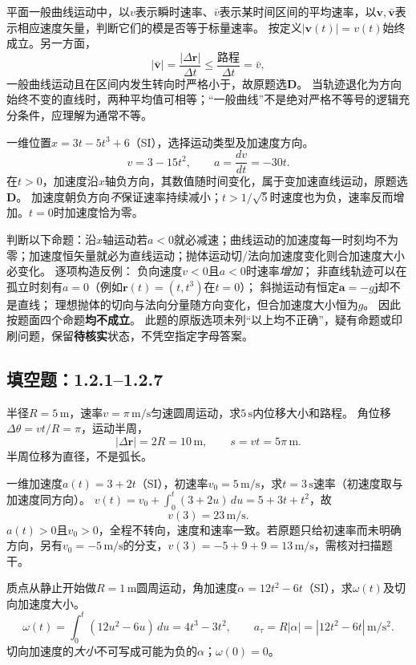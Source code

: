 \problemtext 平面一般曲线运动中，以$v$表示瞬时速率、$\bar v$表示某时间区间的平均速率，以$\bm v,\bar{\bm v}$表示相应速度矢量，判断它们的模是否等于标量速率。
\workings
按定义$|\bm v(t)|=v(t)$始终成立。另一方面，
\[
 |\bar{\bm v}|=\frac{|\Delta\bm r|}{\Delta t}
 \le \frac{\text{路程}}{\Delta t}=\bar v,
\]
一般曲线运动且在区间内发生转向时严格小于，故原题选\textbf{D}。
\crosscheck 当轨迹退化为方向始终不变的直线时，两种平均值可相等；“一般曲线”不是绝对严格不等号的逻辑充分条件，应理解为通常不等。

\problemtext 一维位置$x=3t-5t^3+6$（SI），选择运动类型及加速度方向。
\workings
\[
 v=3-15t^2,\qquad a=\frac{dv}{dt}=-30t.
\]
在$t>0$，加速度沿$x$轴负方向，其数值随时间变化，属于变加速直线运动，原题选\textbf{D}。
\crosscheck 加速度朝负方向\emph{不}保证速率持续减小；$t>1/\sqrt5$时速度也为负，速率反而增加。$t=0$时加速度恰为零。

\problemtext 判断以下命题：沿$x$轴运动若$a<0$就必减速；曲线运动的加速度每一时刻均不为零；加速度恒矢量就必为直线运动；抛体运动切/法向加速度变化则合加速度大小必变化。
\workings
逐项构造反例：
负向速度$v<0$且$a<0$时速率\emph{增加}；
非直线轨迹可以在孤立时刻有$a=0$（例如$\bm r(t)=(t,t^3)$在$t=0$）；
斜抛运动有恒定$\bm a=-g\bm j$却不是直线；
理想抛体的切向与法向分量随方向变化，但合加速度大小恒为$g$。
因此按题面四个命题\textbf{均不成立}。
\crosscheck 此题的原版选项未列“以上均不正确”，疑有命题或印刷问题，保留\textbf{待核实}状态，不凭空指定字母答案。

\subsection{填空题：1.2.1--1.2.7}
\problemtext 半径$R=5\,\mathrm m$，速率$v=\pi\,\mathrm{m/s}$匀速圆周运动，求$5\,\mathrm s$内位移大小和路程。
\workings
角位移$\Delta\theta=vt/R=\pi$，运动半周，
\[
 \boxed{|\Delta\bm r|=2R=10\,\mathrm m,\qquad
 s=vt=5\pi\,\mathrm m}.
\]
\crosscheck 半周位移为直径，不是弧长。

\problemtext 一维加速度$a(t)=3+2t$（SI），初速率$v_0=5\,\mathrm{m/s}$，求$t=3\,\mathrm s$速率（初速度取与加速度同方向）。
\workings
$v(t)=v_0+\int_0^t(3+2u)\,du=5+3t+t^2$，故
\[
\boxed{v(3)=23\,\mathrm{m/s}}.
\]
\crosscheck $a(t)>0$且$v_0>0$，全程不转向，速度和速率一致。若原题只给初速率而未明确方向，另有$v_0=-5\,\mathrm{m/s}$的分支，$v(3)=-5+9+9=13\,\mathrm{m/s}$，需核对扫描题干。

\problemtext 质点从静止开始做$R=1\,\mathrm m$圆周运动，角加速度$\alpha=12t^2-6t$（SI），求$\omega(t)$及切向加速度大小。
\workings
\[
 \omega(t)=\int_0^t(12u^2-6u)\,du
 =4t^3-3t^2,\qquad
 \boxed{a_\tau=R|\alpha|=|12t^2-6t|\,\mathrm{m/s^2}}.
\]
\crosscheck 切向加速度的\emph{大小}不可写成可能为负的$\alpha$；$\omega(0)=0$。

